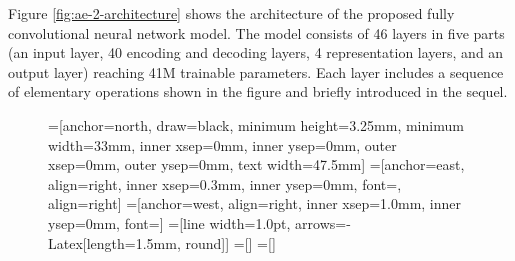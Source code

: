 \documentclass[twocolumn,letter,10pt]{IEEEtran} %
\begin{document}
Figure \ref{fig:ae-2-architecture} shows the architecture of the proposed fully convolutional neural network model. The model consists of 46 layers in five parts (an input layer, 40 encoding and decoding layers, 4 representation layers, and an output layer) reaching 41M trainable parameters. Each layer includes a sequence of elementary operations shown in the figure and briefly introduced in the sequel. 

\begin{figure}[!htbp]
	\pgfmathsetlengthmacro\LblR{5mm}
	\pgfmathsetlengthmacro\LblL{6mm}
	\pgfmathsetlengthmacro\AllLayerWidth{1.75mm}
	\pgfmathsetlengthmacro\InnerLayerSep{3.9mm}
	\pgfmathsetlengthmacro\InnerLayerSepMerge{0.6mm}
	\pgfmathsetlengthmacro\SkpXShift{2mm}	
	
	
	
	\def\vsvsin{-2.75mm}
	\def\vshdin{-0.90mm}
	\def\vshdot{-1.99mm}
	\def\vsvsot{-2.75mm}
	
	\def\CONVHeight{3.25mm}
	\def\CONVWidth{33mm}
	
	=[anchor=north, draw=black, minimum height=\CONVHeight, minimum width=\CONVWidth,
	inner xsep=0mm, inner ysep=0mm, outer xsep=0mm, outer ysep=0mm, text width=47.5mm]
	=[anchor=east, align=right, inner xsep=0.3mm, inner ysep=0mm, font={\tiny}, align=right]
	=[anchor=west, align=right, inner xsep=1.0mm, inner ysep=0mm, font={\scriptsize}]
	=[line width=1.0pt, arrows={-{Latex[length=1.5mm, round]}}]
	=[]
	=[]
	
	
	\centering
	\scriptsize
	\begin{tikzpicture}
	

\end{tikzpicture}
\end{figure}
\end{document}
